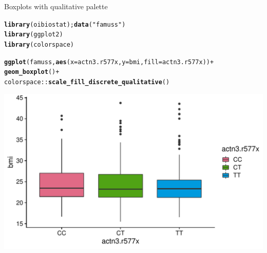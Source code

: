 \documentclass[10pt,handout]{beamer}\usepackage[]{graphicx}\usepackage[]{color}
\makeatletter
\def\maxwidth{ %
  \ifdim\Gin@nat@width>\linewidth
    \linewidth
  \else
    \Gin@nat@width
  \fi
}
\newcommand{\hlstr}[1]{\textcolor[rgb]{0.192,0.494,0.8}{#1}}%
\newcommand{\hlopt}[1]{\textcolor[rgb]{0,0,0}{#1}}%
\newcommand{\hlstd}[1]{\textcolor[rgb]{0.345,0.345,0.345}{#1}}%
\newcommand{\hlkwc}[1]{\textcolor[rgb]{0.333,0.667,0.333}{#1}}%
\newcommand{\hlkwd}[1]{\textcolor[rgb]{0.737,0.353,0.396}{\textbf{#1}}}%
\newenvironment{kframe}{%
 \def\at@end@of@kframe{}%
 \ifinner\ifhmode%
  \def\at@end@of@kframe{\end{minipage}}%
  \begin{minipage}{\columnwidth}%
 \fi\fi%
 \def\FrameCommand##1{\hskip\@totalleftmargin \hskip-\fboxsep
 \colorbox{shadecolor}{##1}\hskip-\fboxsep
     \hskip-\linewidth \hskip-\@totalleftmargin \hskip\columnwidth}%
 \MakeFramed {\advance\hsize-\width
   \@totalleftmargin\z@ \linewidth\hsize
   \@setminipage}}%
 {\par\unskip\endMakeFramed%
 \at@end@of@kframe}
\newenvironment{knitrout}{}{} %
\makeatother
\begin{document}
\begin{frame}[fragile]{Boxplots with qualitative palette}
\begin{knitrout}\tiny
{}\color{fgcolor}\begin{kframe}
\begin{alltt}
\hlkwd{library}\hlstd{(oibiostat);} \hlkwd{data}\hlstd{(}\hlstr{"famuss"}\hlstd{)}
\hlkwd{library}\hlstd{(ggplot2)}
\hlkwd{library}\hlstd{(colorspace)}

\hlkwd{ggplot}\hlstd{(famuss,} \hlkwd{aes}\hlstd{(}\hlkwc{x} \hlstd{= actn3.r577x,} \hlkwc{y} \hlstd{= bmi,} \hlkwc{fill} \hlstd{= actn3.r577x))} \hlopt{+}
\hlkwd{geom_boxplot}\hlstd{()} \hlopt{+}
\hlstd{colorspace}\hlopt{::}\hlkwd{scale_fill_discrete_qualitative}\hlstd{()}
\end{alltt}
\end{kframe}

{\centering \includegraphics[width=\maxwidth]{figure/unnamed-chunk-2-1} 

}


\end{knitrout}
\end{frame}
\end{document}
